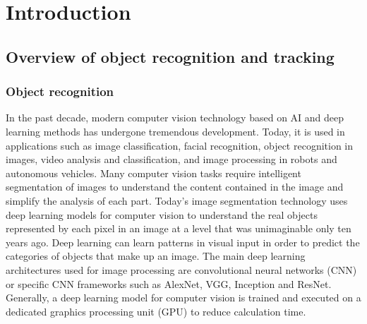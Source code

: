 \chapter{Introduction}

\section{Overview of object recognition and tracking}
\subsection{Object recognition}
In the past decade, modern computer vision technology based on AI and deep learning methods has undergone tremendous development. Today, it is used in applications such as image classification, facial recognition, object recognition in images, video analysis and classification, and image processing in robots and autonomous vehicles. Many computer vision tasks require intelligent segmentation of images to understand the content contained in the image and simplify the analysis of each part. Today's image segmentation technology uses deep learning models for computer vision to understand the real objects represented by each pixel in an image at a level that was unimaginable only ten years ago. Deep learning can learn patterns in visual input in order to predict the categories of objects that make up an image. The main deep learning architectures used for image processing are convolutional neural networks (CNN) or specific CNN frameworks such as AlexNet, VGG, Inception and ResNet. Generally, a deep learning model for computer vision is trained and executed on a dedicated graphics processing unit (GPU) to reduce calculation time.

